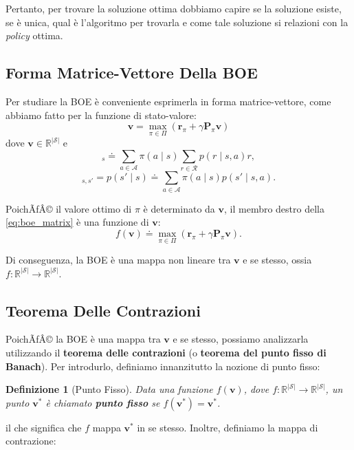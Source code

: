 ﻿\documentclass[11pt, a4paper]{report}
\newtheorem{definition}{Definizione}
\begin{document}
Pertanto, per trovare la soluzione ottima dobbiamo capire se la soluzione esiste, se è unica, qual è l'algoritmo per trovarla e come tale soluzione si relazioni con la \emph{policy} ottima.

\subsection{Forma Matrice-Vettore Della BOE}

Per studiare la BOE è conveniente esprimerla in forma matrice-vettore, come abbiamo fatto per la funzione di stato-valore:
\begin{equation}
\bm{v} = \max_{\pi \in \Pi} (\bm{r}_\pi + \gamma \bm{P}_\pi \bm{v})
\end{equation}
dove $\bm{v} \in \mathbb{R}^{|\mathcal{S}|}$ e
\begin{equation}
[\bm{r}_\pi]_s \doteq \sum_{a \in \mathcal{A}} \pi(a \mid s) \sum_{r \in \mathcal{R}} p(r \mid s, a)r,
\end{equation}
\begin{equation}
[\bm{P}_\pi]_{s, s'} = p(s' \mid s) \doteq \sum_{a \in \mathcal{A}} \pi(a \mid s) p(s' \mid s, a).
\end{equation}

PoichÃƒÂ© il valore ottimo di $\pi$ è determinato da $\bm{v}$, il membro destro della \eqref{eq:boe_matrix} è una funzione di $\bm{v}$:
\begin{equation}
f(\bm{v}) \doteq \max_{\pi \in \Pi} (\bm{r}_\pi + \gamma \bm{P}_\pi \bm{v}).
\end{equation}

Di conseguenza, la BOE è una mappa non lineare tra $\bm{v}$ e se stesso, ossia $f : \mathbb{R}^{|\mathcal{S}|} \to \mathbb{R}^{|\mathcal{S}|}$.

\subsection{Teorema Delle Contrazioni}

PoichÃƒÂ© la BOE è una mappa tra $\bm{v}$ e se stesso, possiamo analizzarla utilizzando il \textbf{teorema delle contrazioni} (o \textbf{teorema del punto fisso di Banach}). Per introdurlo, definiamo innanzitutto la nozione di punto fisso:

\begin{definition}[Punto Fisso]
Data una funzione $f(\bm{v})$, dove $f : \mathbb{R}^{|\mathcal{S}|} \to \mathbb{R}^{|\mathcal{S}|}$, un punto $\bm{v}^*$ è chiamato \textbf{punto fisso} se $f(\bm{v}^*) = \bm{v}^*$.
\end{definition}
il che significa che $f$ mappa $\bm{v}^*$ in se stesso. Inoltre, definiamo la mappa di contrazione:
\end{document}
